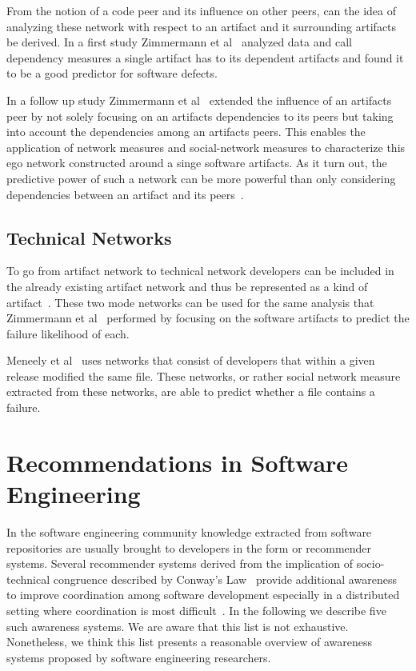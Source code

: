From the notion of a code peer and its influence on other peers, can the idea of analyzing these network with respect to an artifact and it surrounding artifacts be derived.
In a first study Zimmermann et al~\cite{zimmermann:icse:2008} analyzed data and call dependency measures a single artifact has to its dependent artifacts and found it to be a good predictor for software defects.

In a follow up study Zimmermann et al~\cite{zimmermann:esem:2009} extended the influence of an artifacts peer by not solely focusing on an artifacts dependencies to its peers but taking into account the dependencies among an artifacts peers.
This enables the application of network measures and social-network measures to characterize this ego network constructed around a singe software artifacts.
As it turn out, the predictive power of such a network can be more powerful than only considering dependencies between an artifact and its peers~\cite{zimmermann:esem:2009}.

\subsection{Technical Networks}
\label{chap:6:tn}
To go from artifact network to technical network developers can be included in the already existing artifact network and thus be represented as a kind of artifact~\cite{pinzger:fse:2008}.
These two mode networks can be used for the same analysis that Zimmermann et al~\cite{zimmermann:esem:2009,zimmermann:icse:2008} performed by focusing on the software artifacts to predict the failure likelihood of each.

Meneely et al~\cite{meneely:fse:2008} uses networks that consist of developers that within a given release modified the same file.
These networks, or rather social network measure extracted from these networks, are able to predict whether a file contains a failure.









\section{Recommendations in Software Engineering}
In the software engineering community knowledge extracted from software repositories are usually brought to developers in the form or recommender systems.
Several recommender systems derived from the implication of socio-technical congruence described by Conway's Law~\cite{conway:datamination:1968} provide additional awareness to improve coordination among software development especially in a distributed setting where coordination is most difficult~\cite{olson:hci:2000}.
In the following we describe five such awareness systems.
We are aware that this list is not exhaustive. 
Nonetheless, we think this list presents a reasonable overview of awareness systems proposed by software engineering researchers.

